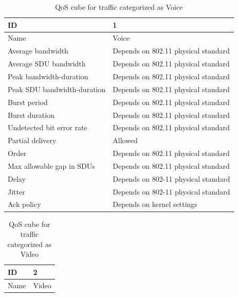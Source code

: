 \begin{table}[H]
		\begin{center}
		\begin{tabular}{|l|l|}
			\hline
				ID 										& 		1 \\ \hline
				Name 									&			Voice \\ \hline
				Average bandwidth 		&			Depends on 802.11 physical standard \\ \hline
				Average SDU bandwidth 									&			Depends on 802.11 physical standard										 \\ \hline
				Peak bandwidth-duration 									&		Depends on 802.11 physical standard											 \\ \hline
				Peak SDU bandwidth-duration 									&			Depends on 802.11 physical standard										 \\ \hline
				Burst period 									&			Depends on 802.11 physical standard										 \\ \hline
				Burst duration 									&		Depends on 802.11 physical standard											 \\ \hline
				Undetected bit error rate 									&			Depends on 802.11 physical standard										 \\ \hline
				Partial delivery 									&			Allowed										 \\ \hline
				Order 									&				Depends on 802.11 physical standard									 \\ \hline
				Max allowable gap in SDUs 				&				Depends on 802.11 physical standard									 \\ \hline
				Delay 									&			Depends on 802-11 physical	standard									 \\ \hline
				Jitter 									&			Depends on 802-11 physical standard										 \\ \hline
				Ack policy							&			Depends on kernel settings				\\ \hline
		\end{tabular}
		\caption{QoS cube for traffic categorized as Voice}
		\end{center}
\end{table}

\npar

\begin{table}[H]
	\begin{center}
		\begin{tabular}{|l|l|}
			\hline
				ID & 2  \\ \hline
				Name & Video \\ \hline
		\end{tabular}
		\caption{QoS cube for traffic categorized as Video}
	\end{center}
\end{table}

